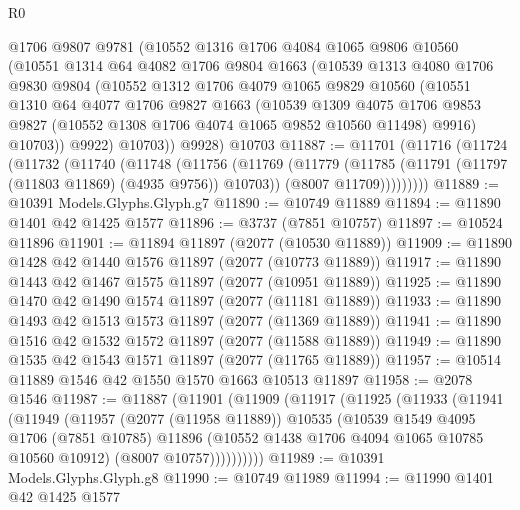 \begin{lexlean}{R0}
\begin{coremodule}
      @1706
      @9807
      @9781
      (@10552
        @1316
        @1706
        @4084
        @1065
        @9806
        @10560
        (@10551
          @1314
          @64
          @4082
          @1706
          @9804
          @1663
          (@10539
            @1313
            @4080
            @1706
            @9830
            @9804
            (@10552
              @1312
              @1706
              @4079
              @1065
              @9829
              @10560
              (@10551
                @1310
                @64
                @4077
                @1706
                @9827
                @1663
                (@10539
                  @1309
                  @4075
                  @1706
                  @9853
                  @9827
                  (@10552 @1308 @1706 @4074 @1065 @9852 @10560 @11498)
                  @9916)
                @10703))
            @9922)
          @10703))
      @9928)
    @10703
@11887 := @11701
    (@11716
      (@11724
        (@11732
          (@11740
            (@11748
              (@11756
                (@11769
                  (@11779
                    (@11785 (@11791 (@11797 (@11803 @11869) (@4935 @9756)) @10703))
                    (@8007 @11709)))))))))
@11889 := @10391 Models.Glyphs.Glyph.g7
@11890 := @10749 @11889
@11894 := @11890 @1401 @42 @1425 @1577
@11896 := @3737 (@7851 @10757)
@11897 := @10524 @11896
@11901 := @11894 @11897 (@2077 (@10530 @11889))
@11909 := @11890 @1428 @42 @1440 @1576 @11897 (@2077 (@10773 @11889))
@11917 := @11890 @1443 @42 @1467 @1575 @11897 (@2077 (@10951 @11889))
@11925 := @11890 @1470 @42 @1490 @1574 @11897 (@2077 (@11181 @11889))
@11933 := @11890 @1493 @42 @1513 @1573 @11897 (@2077 (@11369 @11889))
@11941 := @11890 @1516 @42 @1532 @1572 @11897 (@2077 (@11588 @11889))
@11949 := @11890 @1535 @42 @1543 @1571 @11897 (@2077 (@11765 @11889))
@11957 := @10514 @11889 @1546 @42 @1550 @1570 @1663 @10513 @11897
@11958 := @2078 @1546
@11987 := @11887
    (@11901
      (@11909
        (@11917
          (@11925
            (@11933
              (@11941
                (@11949
                  (@11957
                    (@2077 (@11958 @11889))
                    @10535
                    (@10539
                      @1549
                      @4095
                      @1706
                      (@7851 @10785)
                      @11896
                      (@10552 @1438 @1706 @4094 @1065 @10785 @10560 @10912)
                      (@8007 @10757))))))))))
@11989 := @10391 Models.Glyphs.Glyph.g8
@11990 := @10749 @11989
@11994 := @11990 @1401 @42 @1425 @1577

\end{coremodule}
\end{lexlean}
